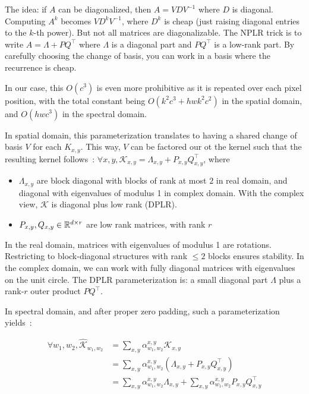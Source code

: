 \begin{ThomasAnnotation}
The idea: if $A$ can be diagonalized, then $A = V D V^{-1}$ where $D$ is diagonal. Computing $A^k$ becomes $V D^k V^{-1}$, where $D^k$ is cheap (just raising diagonal entries to the $k$-th power). But not all matrices are diagonalizable. The NPLR trick is to write $A = \Lambda + P Q^\top$ where $\Lambda$ is a diagonal part and $PQ^\top$ is a low-rank part. By carefully choosing the change of basis, you can work in a basis where the recurrence is cheap.
\end{ThomasAnnotation}

In our case, this $O(c^3)$ is even more prohibitive as it is repeated over each pixel position, with the total constant being $O(k^2c^3 + hwk^2c^2)$ in the spatial domain, and $O(hwc^3)$ in the spectral domain.

In spatial domain, this parameterization translates to having a shared change of basis $V$ for each $K_{x,y}$. This way, $V$ can be factored our ot the kernel such that the resulting kernel follows~: $\forall x,y, \mathcal{K}_{x,y} = \Lambda_{x,y} + P_{x,y} Q_{x,y}^\top$, where
\begin{itemize}
    \item $\Lambda_{x,y}$ are block diagonal with blocks of rank at most $2$ in real domain, and diagonal with eigenvalues of modulus 1 in complex domain. With the complex view, $\mathcal{K}$ is diagonal plus low rank (DPLR).
    \item $P_{x,y}, Q_{x,y} \in \mathbb{R}^{d\times r}$ are low rank matrices, with rank $r$
\end{itemize}

\begin{ThomasAnnotation}
In the real domain, matrices with eigenvalues of modulus 1 are rotations. Restricting to block-diagonal structures with rank $\leq 2$ blocks ensures stability. In the complex domain, we can work with fully diagonal matrices with eigenvalues on the unit circle. The DPLR parameterization is: a small diagonal part $\Lambda$ plus a rank-$r$ outer product $PQ^\top$.
\end{ThomasAnnotation}

In spectral domain, and after proper zero padding, such a parameterization yields~:

\begin{align*}
    \forall w_1,w_2, \widehat{\mathcal{K}}_{w_1,w_2} &= \sum_{x,y} \alpha_{w_1,w_2}^{x,y} \mathcal{K}_{x,y}\\
    &= \sum_{x,y} \alpha_{w_1,w_2}^{x,y} \left(\Lambda_{x,y} + P_{x,y} Q_{x,y}^\top\right)\\
    &= \sum_{x,y} \alpha_{w_1,w_2}^{x,y} \Lambda_{x,y} + \sum_{x,y} \alpha_{w_1,w_2}^{x,y}P_{x,y} Q_{x,y}^\top\\
\end{align*}

